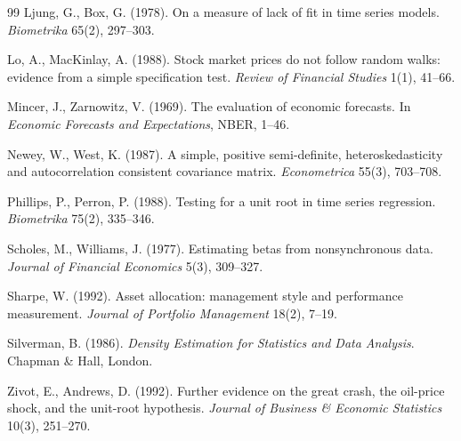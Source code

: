 \documentclass[11pt,a4paper]{article}
\begin{document}
\begin{thebibliography}{99}
Ljung, G., Box, G. (1978). On a measure of lack of fit in time series models.
\emph{Biometrika} 65(2), 297--303.

Lo, A., MacKinlay, A. (1988). Stock market prices do not follow random walks:
evidence from a simple specification test.
\emph{Review of Financial Studies} 1(1), 41--66.

Mincer, J., Zarnowitz, V. (1969). The evaluation of economic forecasts. In
\emph{Economic Forecasts and Expectations}, NBER, 1--46.

Newey, W., West, K. (1987). A simple, positive semi-definite, heteroskedasticity and
autocorrelation consistent covariance matrix. \emph{Econometrica} 55(3), 703--708.

Phillips, P., Perron, P. (1988). Testing for a unit root in time series regression.
\emph{Biometrika} 75(2), 335--346.

Scholes, M., Williams, J. (1977). Estimating betas from nonsynchronous data.
\emph{Journal of Financial Economics} 5(3), 309--327.

Sharpe, W. (1992). Asset allocation: management style and performance measurement.
\emph{Journal of Portfolio Management} 18(2), 7--19.

Silverman, B. (1986). \emph{Density Estimation for Statistics and Data Analysis}.
Chapman \& Hall, London.

Zivot, E., Andrews, D. (1992). Further evidence on the great crash, the oil-price
shock, and the unit-root hypothesis.
\emph{Journal of Business \& Economic Statistics} 10(3), 251--270.
\end{thebibliography}
\end{document}
